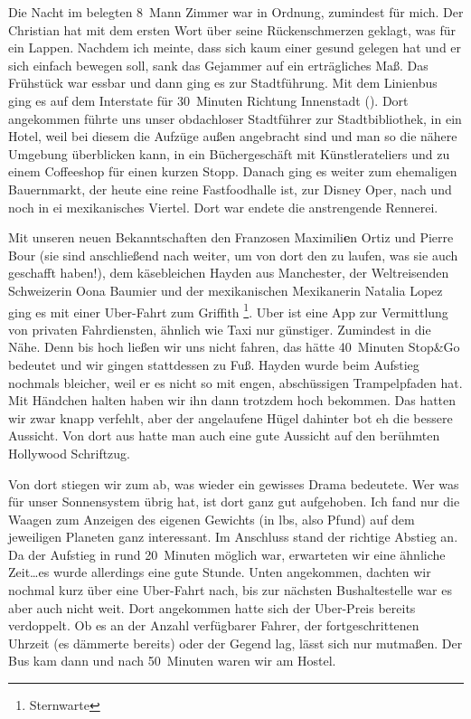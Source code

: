 Die Nacht im belegten 8~Mann Zimmer war in Ordnung, zumindest für mich.
Der Christian hat mit dem ersten Wort über seine Rückenschmerzen geklagt, was für ein Lappen.
Nachdem ich meinte, dass sich kaum einer gesund gelegen hat und er sich einfach bewegen soll, sank das Gejammer auf ein erträgliches Maß.
Das Frühstück war essbar und dann ging es zur Stadtführung.
Mit dem Linienbus ging es auf dem Interstate für 30~Minuten Richtung Innenstadt ().
Dort angekommen führte uns unser obdachloser Stadtführer zur Stadtbibliothek, in ein Hotel, weil bei diesem die Aufzüge außen angebracht sind und man so die nähere Umgebung überblicken kann, in ein Büchergeschäft mit Künstlerateliers und zu einem Coffeeshop für einen kurzen Stopp.
Danach ging es weiter zum ehemaligen Bauernmarkt, der heute eine reine Fastfoodhalle ist, zur Disney Oper, nach  und noch in ei mexikanisches Viertel.
Dort war endete die anstrengende Rennerei.

Mit unseren neuen Bekanntschaften den Franzosen Maximili\textbf{e}n Ortiz und Pierre Bour (sie sind anschließend nach  weiter, um von dort den  zu laufen, was sie auch geschafft haben!), dem käsebleichen Hayden aus Manchester, der Weltreisenden Schweizerin Oona Baumier und der mexikanischen Mexikanerin Natalia Lopez ging es mit einer Uber-Fahrt zum Griffith \footnote{Sternwarte}.
Uber ist eine App zur Vermittlung von privaten Fahrdiensten, ähnlich wie Taxi nur günstiger.
Zumindest in die Nähe.
Denn bis hoch ließen wir uns nicht fahren, das hätte 40~Minuten Stop\&Go bedeutet und wir gingen stattdessen zu Fuß.
Hayden wurde beim Aufstieg nochmals bleicher, weil er es nicht so mit engen, abschüssigen Trampelpfaden hat.
Mit Händchen halten haben wir ihn dann trotzdem hoch bekommen.
Das  hatten wir zwar knapp verfehlt, aber der angelaufene Hügel dahinter bot eh die bessere Aussicht.
Von dort aus hatte man auch eine gute Aussicht auf den berühmten Hollywood Schriftzug.

Von dort stiegen wir zum  ab, was wieder ein gewisses Drama bedeutete.
Wer was für unser Sonnensystem übrig hat, ist dort ganz gut aufgehoben.
Ich fand nur die Waagen zum Anzeigen des eigenen Gewichts (in lbs, also Pfund) auf dem jeweiligen Planeten ganz interessant.
Im Anschluss stand der richtige Abstieg an.
Da der Aufstieg in rund 20~Minuten möglich war, erwarteten wir eine ähnliche Zeit\dots es wurde allerdings eine gute Stunde.
Unten angekommen, dachten wir nochmal kurz über eine Uber-Fahrt nach, bis zur nächsten Bushaltestelle war es aber auch nicht weit.
Dort angekommen hatte sich der Uber-Preis bereits verdoppelt.
Ob es an der Anzahl verfügbarer Fahrer, der fortgeschrittenen Uhrzeit (es dämmerte bereits) oder der Gegend lag, lässt sich nur mutmaßen.
Der Bus kam dann und nach 50~Minuten waren wir am Hostel.

